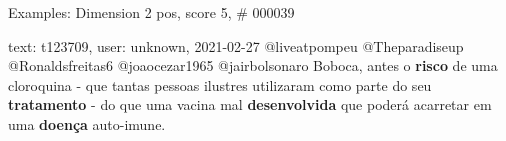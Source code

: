 \begin{frame}{Examples: Dimension 2 pos, score 5, \# 000039}
\footnotesize
\begin{exampleblock}{text: t123709, user: unknown, 2021-02-27}
@liveatpompeu @Theparadiseup @Ronaldsfreitas6 @joaocezar1965 @jairbolsonaro 
Boboca, antes o \textbf{risco} de uma cloroquina - que tantas pessoas ilustres 
utilizaram como parte do seu \textbf{tratamento} - do que uma vacina mal 
\textbf{desenvolvida} que poderá acarretar em uma \textbf{doença} auto-imune. 
\end{exampleblock}
\end{frame}
